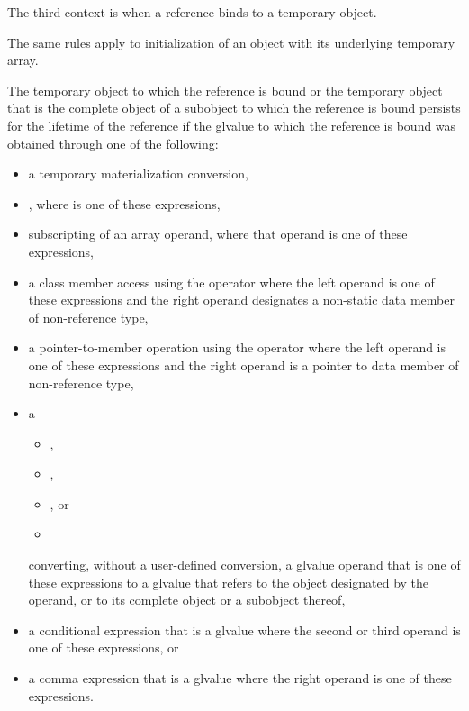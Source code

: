 \pnum
The third context is when a reference binds to a temporary object.
\begin{footnote}
The same rules apply to initialization of an
   object with its
  underlying temporary array.
\end{footnote}
The temporary object to which the reference is bound or the temporary object
that is the complete object of a subobject to which the reference is bound
persists for the lifetime of the reference if the glvalue
to which the reference is bound
was obtained through one of the following:
\begin{itemize}
\item
  a temporary materialization conversion,
\item
  \tcode{(}  \tcode{)},
  where  is one of these expressions,
\item
  subscripting of an array operand,
  where that operand is one of these expressions,
\item
  a class member access using the  operator
  where the left operand is one of these expressions and
  the right operand designates a non-static data member of non-reference type,
\item
  a pointer-to-member operation using the  operator
  where the left operand is one of these expressions and
  the right operand is a pointer to data member of non-reference type,
\item
  a
  \begin{itemize}
  \item {},
  \item {},
  \item {}, or
  \item {}
  \end{itemize}
  converting, without a user-defined conversion,
  a glvalue operand that is one of these expressions
  to a glvalue that refers
  to the object designated by the operand, or
  to its complete object or a subobject thereof,
\item
  a conditional expression that is a glvalue
  where the second or third operand is one of these expressions, or
\item
  a comma expression that is a glvalue
  where the right operand is one of these expressions.
\end{itemize}
